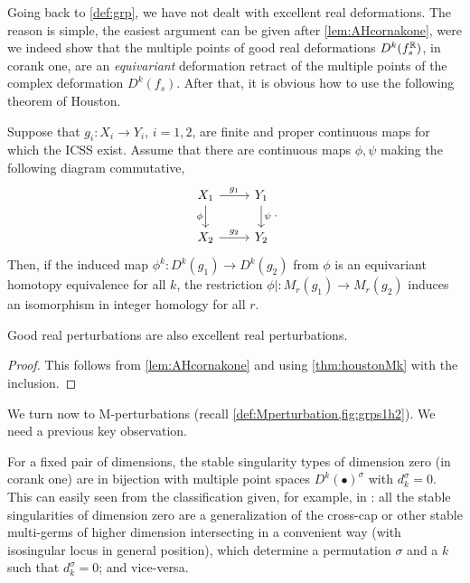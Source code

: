 \documentclass[a4paper,12pt]{amsart}
\begin{document}
Going back to \cref{def:grp}, we have not dealt with excellent real deformations. The reason is simple, the easiest argument can be given after \cref{lem:AHcornakone}, were we indeed show that the multiple points of good real deformations $D^k(f_s^{\mathbb{R}})$, in corank one, are an \textsl{equivariant} deformation retract of the multiple points of the complex deformation $D^k(f_s)$. After that, it is obvious how to use the following theorem of Houston.

\begin{theorem}\label{thm:houstonMk}
Suppose that $g_i:X_i\to Y_i$, $i=1,2$, are finite and proper continuous maps for which the ICSS exist. Assume that there are continuous maps $\phi,\psi$ making the following diagram commutative,
\[\begin{tikzcd}
	{X_1} & {Y_1} \\
	{X_2} & {Y_2}
	\arrow["{g_1}", from=1-1, to=1-2]
	\arrow["\phi"', from=1-1, to=2-1]
	\arrow["\psi", from=1-2, to=2-2]
	\arrow["{g_2}", from=2-1, to=2-2]
\end{tikzcd}.\]
Then, if the induced map $\phi^k:D^k(g_1)\to D^k(g_2)$ from $\phi$ is an equivariant homotopy equivalence for all $k$, the restriction $\phi|:M_r(g_1)\to M_r(g_2)$ induces an isomorphism in integer homology for all $r$.
\end{theorem}

\begin{proposition}\label{prop:good=excellent}
Good real perturbations are also excellent real perturbations.
\end{proposition}
\begin{proof}
This follows from \cref{lem:AHcornakone} and using \cref{thm:houstonMk} with the inclusion.
\end{proof}

We turn now to M-perturbations (recall \cref{def:Mperturbation,fig:grps1h2}). We need a previous key observation.

\begin{remark}\label{rem:typesdim0}
For a fixed pair of dimensions, the stable singularity types of dimension zero (in corank one) are in bijection with multiple point spaces $D^k(\bullet)^\sigma$ with $d_k^\sigma=0$. This can easily seen from the classification given, for example, in \cite[Proposition 3.4]{OsetSinha2022}: all the stable singularities of dimension zero are a generalization of the cross-cap or other stable multi-germs of higher dimension intersecting in a convenient way (with isosingular locus in general position), which determine a permutation $\sigma$ and a $k$ such that $d_k^\sigma=0$; and vice-versa.
\end{remark}
\end{document}
